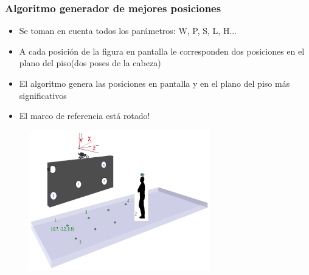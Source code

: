 \documentclass[10pt, compress]{beamer}
\begin{document}
\begin{frame}[fragile]
	\frametitle{Algoritmo generador de mejores posiciones}
	\begin{itemize}
		\item Se toman en cuenta todos los parámetros: W, P, S, L, H...
		\item A cada posición de la figura en pantalla le corresponden dos posiciones en el plano del piso(dos poses de la cabeza)
		\item El algoritmo genera las posiciones en pantalla y en el plano del piso más significativos
		\item El marco de referencia está rotado!
	\end{itemize}
	\begin{figure}[htbp]
		\includegraphics[width=0.7\textwidth]{./pictures/puntos}
	\end{figure}
\end{frame}
%
\end{document}

